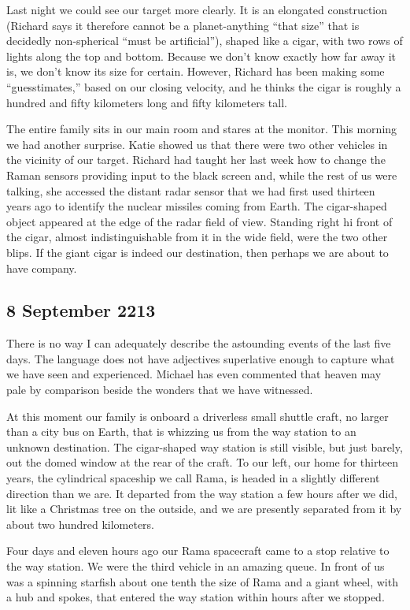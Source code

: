 \documentclass[]{article}
\begin{document}
{Last night we could see our target more clearly.  It is an elongated construction (Richard says it therefore cannot be a planet-anything “that size” that is decidedly non-spherical “must be artificial”), shaped like a cigar, with two rows of lights along the top and bottom.  Because we don’t know exactly how far away it is, we don’t know its size for certain.  However, Richard has been making some “guesstimates,” based on our closing velocity, and he thinks the cigar is roughly a hundred and fifty kilometers long and fifty kilometers tall.

The entire family sits in our main room and stares at the monitor.  This morning we had another surprise.  Katie showed us that there were two other vehicles in the vicinity of our target.  Richard had taught her last week how to change the Raman sensors providing input to the black screen and, while the rest of us were talking, she accessed the distant radar sensor that we had first used thirteen years ago to identify the nuclear missiles coming from Earth.  The cigar-shaped object appeared at the edge of the radar field of view.  Standing right hi front of the cigar, almost indistinguishable from it in the wide field, were the two other blips.  If the giant cigar is indeed our destination, then perhaps we are about to have company.

\subsection*{8 September 2213}

There is no way I can adequately describe the astounding events of the last five days.  The language does not have adjectives superlative enough to capture what we have seen and experienced.  Michael has even commented that heaven may pale by comparison beside the wonders that we have witnessed.

At this moment our family is onboard a driverless small shuttle craft, no larger than a city bus on Earth, that is whizzing us from the way station to an unknown destination.  The cigar-shaped way station is still visible, but just barely, out the domed window at the rear of the craft.  To our left, our home for thirteen years, the cylindrical spaceship we call Rama, is headed in a slightly different direction than we are.  It departed from the way station a few hours after we did, lit like a Christmas tree on the outside, and we are presently separated from it by about two hundred kilometers.

Four days and eleven hours ago our Rama spacecraft came to a stop relative to the way station.  We were the third vehicle in an amazing queue.  In front of us was a spinning starfish about one tenth the size of Rama and a giant wheel, with a hub and spokes, that entered the way station within hours after we stopped.

}
\end{document}
